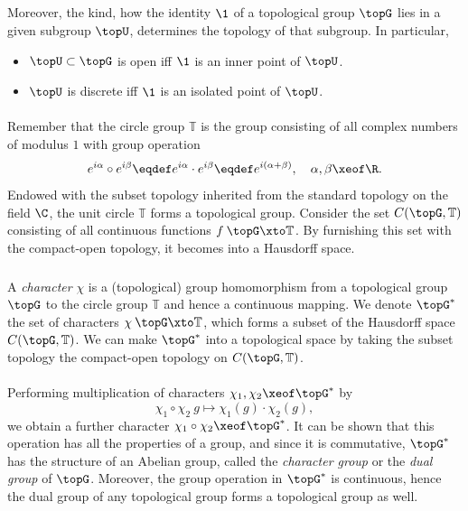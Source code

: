 \documentclass[11pt,twoside]{article}
\begin{document}
\subparagraph{}
Moreover,
the kind,
how the identity $\1$ of a topological group $\topG$ lies
in a given subgroup $\topU$,
determines the topology of that subgroup.
In particular,

\begin{itemize}[leftmargin=12pt]
\item[1.]
$\topU \subset \topG$ is open iff $\1$ is an inner point of $\topU$.

\item[2.]
$\topU$ is discrete iff $\1$ is an isolated point of $\topU$.
\end{itemize}

\paragraph{} %
Remember that the {circle group} $\mathbb{T}$ is the group
consisting of all complex numbers of modulus $1$ with group operation
\[
e^{i \alpha} \circ e^{i \beta} \eqdef
e^{i \alpha} \cdot e^{i \beta} \eqdef
e^{i(\alpha + \beta)},
\quad \alpha,\beta \xeof \R.
\]
Endowed with the subset topology inherited
from the standard topology on the field $\C$,
the unit circle $\mathbb{T}$ forms a topological group.
Consider the set $C(\topG,\mathbb{T})$ consisting of all
continuous functions $f \:\topG \xto \mathbb{T}$.
By furnishing this set with the compact-open topology,
it becomes into a Hausdorff space.

\subparagraph{} %
A \textit{character} $\chi$ is a (topological) group homomorphism from a
topological group $\topG$ to the circle group $\mathbb{T}$
and hence a continuous mapping.
We denote $\topG^*$ the set of characters $\chi \:\topG \xto \mathbb{T}$,
which forms a subset of the Hausdorff space $C(\topG,\mathbb{T})$.
We can make $\topG^*$ into a topological space by taking the subset topology
{\wrt} the compact-open topology on $C(\topG,\mathbb{T})$.

\paragraph{} %
Performing multiplication of characters $\chi_1,\chi_2 \xeof \topG^*$ by
\[
\chi_1 \circ \chi_2\: g \mapsto \chi_1(g) \cdot \chi_2(g),
\]
we obtain a further character $\chi_1 \circ \chi_2 \xeof \topG^*$.
It can be shown that this operation has all the properties of a group,
and since it is commutative,
$\topG^*$ has the structure of an Abelian group,
called the \textit{character group} or the \textit{dual group} of $\topG$.
Moreover,
the group operation in $\topG^*$ is continuous,
hence the dual group of any topological group forms a topological group
as well.
\end{document}
